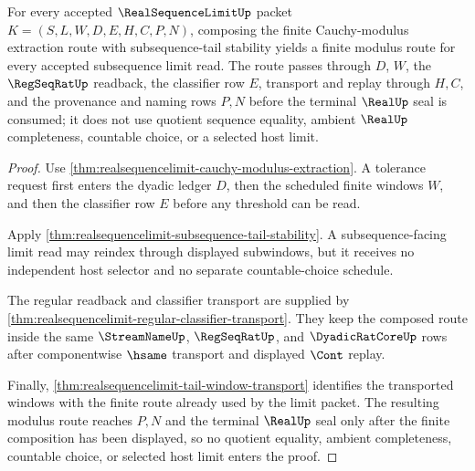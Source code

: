 \begin{theorem}\label{thm:realsequencelimit-limit-modulus-composition}
For every accepted $\RealSequenceLimitUp$ packet $K=(S,L,W,D,E,H,C,P,N)$, composing the finite Cauchy-modulus extraction route with subsequence-tail stability yields a finite modulus route for every accepted subsequence limit read. The route passes through $D$, $W$, the $\RegSeqRatUp$ readback, the classifier row $E$, transport and replay through $H,C$, and the provenance and naming rows $P,N$ before the terminal $\RealUp$ seal is consumed; it does not use quotient sequence equality, ambient $\RealUp$ completeness, countable choice, or a selected host limit.
\end{theorem}
\begin{proof}
Use \autoref{thm:realsequencelimit-cauchy-modulus-extraction}. A tolerance request first enters the dyadic ledger $D$, then the scheduled finite windows $W$, and then the classifier row $E$ before any threshold can be read.

Apply \autoref{thm:realsequencelimit-subsequence-tail-stability}. A subsequence-facing limit read may reindex through displayed subwindows, but it receives no independent host selector and no separate countable-choice schedule.

The regular readback and classifier transport are supplied by \autoref{thm:realsequencelimit-regular-classifier-transport}. They keep the composed route inside the same $\StreamNameUp$, $\RegSeqRatUp$, and $\DyadicRatCoreUp$ rows after componentwise $\hsame$ transport and displayed $\Cont$ replay.

Finally, \autoref{thm:realsequencelimit-tail-window-transport} identifies the transported windows with the finite route already used by the limit packet. The resulting modulus route reaches $P,N$ and the terminal $\RealUp$ seal only after the finite composition has been displayed, so no quotient equality, ambient completeness, countable choice, or selected host limit enters the proof.
\end{proof}

